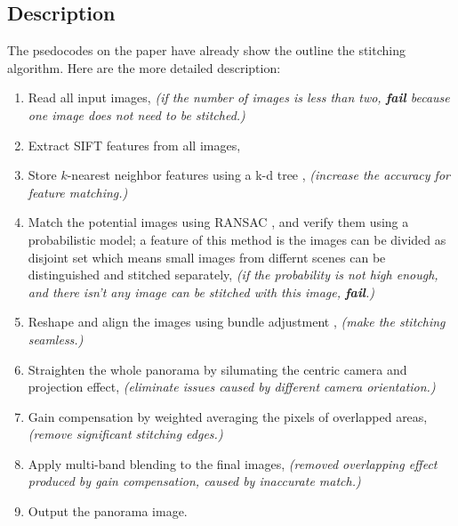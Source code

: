 \documentclass[10pt,twocolumn,letterpaper]{article}
\begin{document}
\subsection{Description}
The psedocodes on the paper have already show the outline the stitching algorithm.
Here are the more detailed description:
\begin{enumerate}
    \item
        Read all input images,
        \textit{(if the number of images is less than two, \textbf{fail} because one image does not need to be stitched.)}
    \item \label{n:e}
        Extract SIFT \cite{sift} features from all images,
    \item \label{n:k}
        Store $k$-nearest neighbor features using a k-d tree \cite{knn},
        \textit{(increase the accuracy for feature matching.)}
    \item \label{n:m}
        Match the potential images using RANSAC \cite{ransac}, and verify them using a probabilistic model;
        a feature of this method is the images can be divided as disjoint set which means small images from differnt scenes can be distinguished and stitched separately,
        \textit{(if the probability is not high enough, and there isn't any image can be stitched with this image, \textbf{fail}.)}
    \item \label{n:r}
        Reshape and align the images using bundle adjustment \cite{bm},
        \textit{(make the stitching seamless.)}
    \item \label{n:s}
        Straighten the whole panorama by silumating the centric camera and projection effect,
        \textit{(eliminate issues caused by different camera orientation.)}
    \item \label{n:g}
        Gain compensation by weighted averaging the pixels of overlapped areas,
        \textit{(remove significant stitching edges.)}
    \item \label{n:a}
        Apply multi-band blending to the final images,
        \textit{(removed overlapping effect produced by gain compensation, caused by inaccurate match.)}
    \item \label{n:o}
        Output the panorama image.
\end{enumerate}

\end{document}
